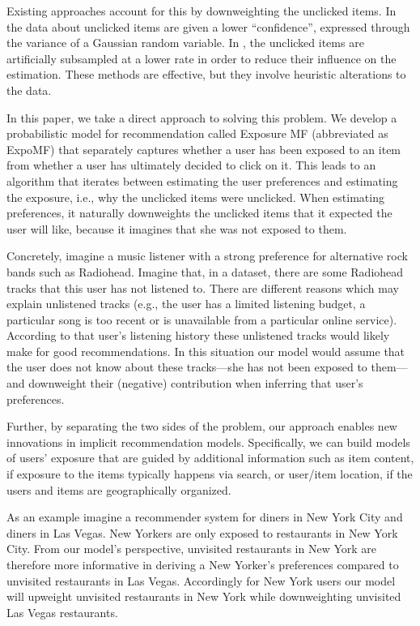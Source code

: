 \documentclass{sig-alternate-arxiv}
\begin{document}
Existing approaches account for this by downweighting the unclicked
items.  In \citet{hu2008collaborative} the data about unclicked items are given a
lower ``confidence'', expressed through the variance of a Gaussian
random variable.  In \citet{rendle2009bpr}, the unclicked items are artificially
subsampled at a lower rate in order to reduce their influence on the
estimation.  These methods are effective, but they involve heuristic
alterations to the data.

In this paper, we take a direct approach to solving this problem.  We
develop a probabilistic model for recommendation called Exposure MF
(abbreviated as ExpoMF) that separately captures whether a user has been exposed to an item from
whether a user has ultimately decided to click on it.  This leads to an
algorithm that iterates between estimating the user preferences and
estimating the exposure, i.e., why the unclicked items were unclicked.
When estimating preferences, it naturally downweights the unclicked items
that it expected the user will like, because it imagines that she was not
exposed to them. 

Concretely, imagine a music listener with a strong preference for alternative
rock bands such as Radiohead. Imagine that, in a dataset, there are some
Radiohead tracks that this user has not listened to. There are different
reasons which may explain unlistened tracks  (e.g., the user has a limited
listening budget, a particular song is too recent or is unavailable from a
particular online service). According to that user's listening history these
unlistened tracks would likely make for good recommendations. In this situation
our model would assume that the user does not know about these tracks---she has
not been exposed to them---and downweight their (negative) contribution when
inferring that user's preferences.

Further, by separating the two sides of the problem, our approach
enables new innovations in implicit recommendation
models. Specifically, we can build models of users' exposure that
are guided by additional information such as item content, if
exposure to the items typically happens via search, or user/item
location, if the users and items are geographically organized.  

As an example imagine a recommender system for diners in New York City and
diners in Las Vegas. New Yorkers are only exposed to restaurants in New York City.
From our model's perspective, unvisited restaurants in New York are therefore more 
informative in deriving a New Yorker's preferences compared to unvisited 
restaurants in Las Vegas. Accordingly for New York users our model will
upweight unvisited restaurants in New York while downweighting unvisited
Las Vegas restaurants. 
\end{document}
